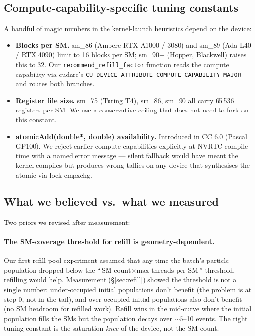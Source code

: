 \subsection{Compute-capability-specific tuning constants}

A handful of magic numbers in the kernel-launch heuristics depend
on the device:

\begin{itemize}
    \item \textbf{Blocks per SM.} sm\_86 (Ampere RTX A1000 / 3080)
        and sm\_89 (Ada L40 / RTX 4090) limit to 16 blocks per SM;
        sm\_90+ (Hopper, Blackwell) raises this to 32. Our
        \texttt{recommend\_refill\_factor} function reads the
        compute capability via cudarc's
        \texttt{CU\_DEVICE\_ATTRIBUTE\_COMPUTE\_CAPABILITY\_MAJOR}
        and routes both branches.
    \item \textbf{Register file size.} sm\_75 (Turing T4), sm\_86,
        sm\_90 all carry 65\,536 registers per SM. We use a
        conservative ceiling that does not need to fork on this
        constant.
    \item \textbf{atomicAdd(double*, double) availability.}
        Introduced in CC 6.0 (Pascal GP100). We reject earlier
        compute capabilities explicitly at NVRTC compile time
        with a named error message --- silent fallback would have
        meant the kernel compiles but produces wrong tallies on
        any device that synthesises the atomic via lock-cmpxchg.
\end{itemize}

\subsection{What we believed vs.\ what we measured}

Two priors we revised after measurement:

\paragraph{The SM-coverage threshold for refill is geometry-dependent.}
Our first refill-pool experiment assumed that any time the
batch's particle population dropped below the
``$\text{SM count} \times \text{max threads per SM}$'' threshold,
refilling would help. Measurement (§\ref{sec:refill}) showed the
threshold is not a single number: under-occupied initial
populations don't benefit (the problem is at step 0, not in the
tail), and over-occupied initial populations also don't benefit
(no SM headroom for refilled work). Refill wins in the mid-curve
where the initial population fills the SMs but the population
decays over $\sim$5--10 events. The right tuning constant is the
saturation \emph{knee} of the device, not the SM count.

